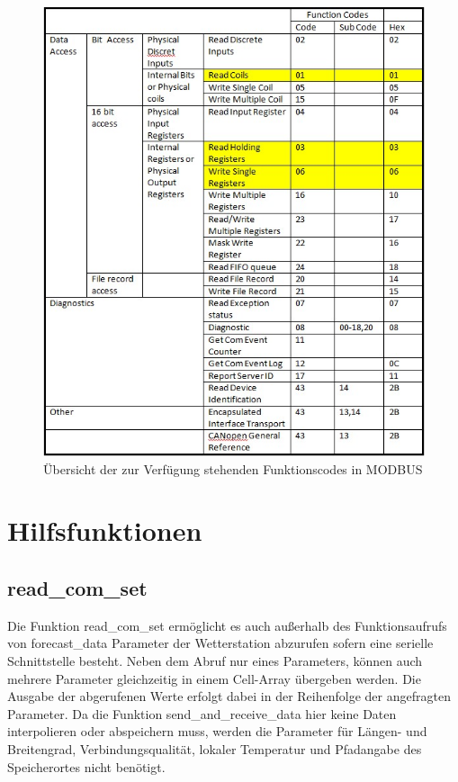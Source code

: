 \begin{figure}[hbtp]
\centering
\includegraphics[scale=0.65]{modbus/fcodetab}
\caption{Übersicht der zur Verfügung stehenden Funktionscodes in MODBUS \cite[S. 11]{ModbusDoc}}
\label{fig:fcodetab}
\end{figure} 
\chapter{Hilfsfunktionen}
\section{read\_com\_set}\label{sec:readcomset}
Die Funktion \textsf{read\_com\_set} ermöglicht es auch außerhalb des Funktionsaufrufs von \textsf{forecast\_data} Parameter der Wetterstation abzurufen sofern eine serielle Schnittstelle besteht. Neben dem Abruf nur eines Parameters, können auch mehrere Parameter gleichzeitig in einem Cell-Array übergeben werden. Die Ausgabe der abgerufenen Werte erfolgt dabei in der Reihenfolge der angefragten Parameter. Da die Funktion \textsf{send\_and\_receive\_data} hier keine Daten interpolieren oder abspeichern muss, werden die Parameter für Längen- und Breitengrad, Verbindungsqualität, lokaler Temperatur und Pfadangabe des Speicherortes nicht benötigt. 

